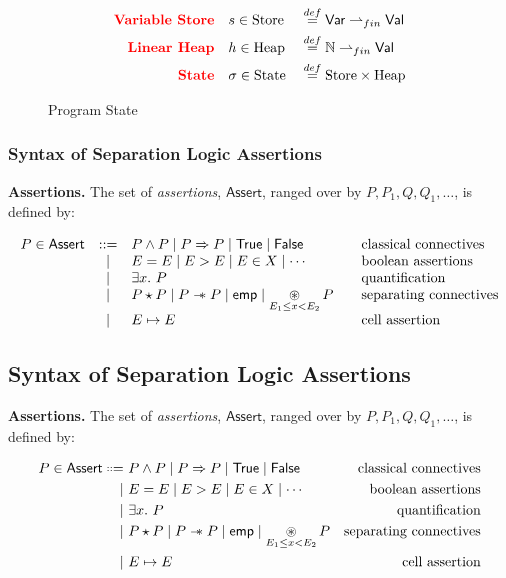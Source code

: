 \documentclass[11pt]{article}
\newcommand{\Assert}{\mathsf{Assert}}
\newcommand{\True}{\mathsf{True}}
\newcommand{\False}{\mathsf{False}}
\newcommand{\Emp}{\mathsf{emp}}
\newcommand{\sepimp}{\mathrel{-\mkern-6mu\ast}}
\newcommand{\Val}{\mathsf{Val}}
\newcommand{\Var}{\mathsf{Var}}
\newcommand*{\ddefeq}{\mathrel{\vcenter{\baselineskip0.5ex \lineskiplimit0pt
                     \hbox{\scriptsize.}\hbox{\scriptsize.}}}%
                      \mathrel{\vcenter{\baselineskip0.5ex \lineskiplimit0pt
                     \hbox{\scriptsize.}\hbox{\scriptsize.}}}
                     =\ }
\begin{document}
\begin{figure}[H]
\centering
\begin{alignat*}{3}
\textbf{\textcolor{red}{Variable Store}} &\quad s \in \text{Store} &&\on{def}{=} \Var \rightharpoonup_{fin} \Val\\
\textbf{\textcolor{red}{Linear Heap}}&\quad h \in \text{Heap} && \on{def}{=} \mathbb{N} \rightharpoonup_{fin} \Val \\
\textbf{\textcolor{red}{State}}&\quad \sigma \in \text{State} && \on{def}{=} \text{Store} \times \text{Heap}  \\
\end{alignat*}
\caption{Program State}
\label{fig:pst}
\end{figure}

\subsubsection*{Syntax of Separation Logic Assertions}
\textbf{Assertions.}
The set of \emph{assertions}, $\Assert$, ranged over by
$P, P_1, Q, Q_1, \ldots$, is defined by:

\[
\begin{array}{rcl@{\qquad}l}
P \in \Assert & ::= &
P \land P \mid P \Rightarrow P \mid \True \mid \False
& \text{classical connectives} \\
& \mid &
E = E \mid E > E \mid E \in X \mid \cdots
& \text{boolean assertions} \\
& \mid &
\exists x.\ P
& \text{quantification} \\
& \mid &
P \star P \mid P \sepimp P \mid \Emp
\mid \displaystyle\mathop{\circledast}_{E_1 \le x < E_2} P
& \text{separating connectives} \\
& \mid &
E \mapsto E
& \text{cell assertion}
\end{array}
\]

\subsection{Syntax of Separation Logic Assertions}
\textbf{Assertions.}
The set of \emph{assertions}, $\Assert$, ranged over by
$P, P_1, Q, Q_1, \ldots$, is defined by:

\begin{align*}
P \in \Assert \ddefeq &
P \land P \mid P \Rightarrow P \mid \True \mid \False
& \text{classical connectives} \\
\mid\ &
E = E \mid E > E \mid E \in X \mid \cdots
& \text{boolean assertions} \\
\mid\ &
\exists x.\ P
& \text{quantification} \\
\mid\ &
P \star P \mid P \sepimp P \mid \Emp
\mid \displaystyle\mathop{\circledast}_{E_1 \le x < E_2} P
& \text{separating connectives} \\
\mid\ &
E \mapsto E
& \text{cell assertion}
\end{align*}
\end{document}

